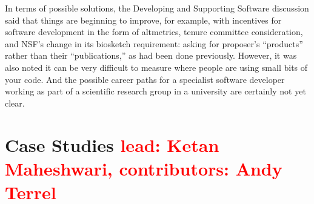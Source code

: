 \documentclass[11pt, oneside]{amsart}
\newcommand{\note}[1]{ {\textcolor{red}    { #1 }}}
\begin{document}
In terms of possible solutions, the Developing and Supporting Software discussion said that things are beginning to improve, for example, with incentives for software development in the form of altmetrics, tenure committee consideration, and NSF's change in its biosketch requirement: asking for proposer's ``products'' rather than their ``publications,'' as had been done previously.
However, it was also noted it can be very difficult to measure where people are using small bits of your code.  And the possible career paths for a specialist software developer working as part of a scientific research group in a university are certainly not yet clear.

\section{Case Studies \note{lead: Ketan Maheshwari, contributors: Andy Terrel}} \label{sec:use-cases}





\end{document}
